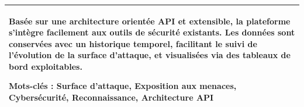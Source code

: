 \documentclass[a4paper,12pt]{report}
\begin{document}
\begin{tabular}{|p{}|}
\vspace{0.5em}
Basée sur une architecture orientée API et extensible, la plateforme s'intègre facilement aux outils de sécurité existants. Les données sont conservées avec un historique temporel, facilitant le suivi de l'évolution de la surface d'attaque, et visualisées via des tableaux de bord exploitables.

\vspace{0.5em}
\textbf{Mots-clés :} Surface d'attaque, Exposition aux menaces, Cybersécurité, Reconnaissance, Architecture API
\\[0.6em]
\hline
\end{tabular}

\vspace*{\fill}
\end{document}
